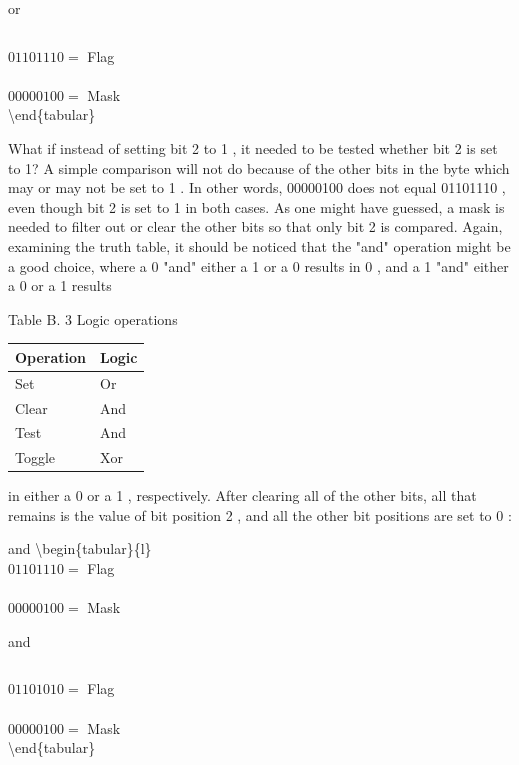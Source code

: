 \documentclass[10pt]{book}
\begin{document}
\begin{center}
\begin{center}
\begin{center}
\begin{center}
\begin{center}
 or $\quad$\begin{tabular}{l}
\end{tabular}

$01101110=$ Flag \\
\\
$00000100=$ Mask\\
\textbackslash end\{tabular\}

What if instead of setting bit 2 to 1 , it needed to be tested whether bit 2 is set to 1? A simple comparison will not do because of the other bits in the byte which may or may not be set to 1 . In other words, 00000100 does not equal 01101110 , even though bit 2 is set to 1 in both cases. As one might have guessed, a mask is needed to filter out or clear the other bits so that only bit 2 is compared. Again, examining the truth table, it should be noticed that the "and" operation might be a good choice, where a 0 "and" either a 1 or a 0 results in 0 , and a 1 "and" either a 0 or a 1 results

Table B. 3 Logic operations

\begin{center}
\begin{tabular}{|l|l|}
\hline
Operation & Logic \\
\hline
Set & Or \\
\hline
Clear & And \\
\hline
Test & And \\
\hline
Toggle & Xor \\
\hline
\end{tabular}
\end{center}

in either a 0 or a 1 , respectively. After clearing all of the other bits, all that remains is the value of bit position 2 , and all the other bit positions are set to 0 :

and \textbackslash begin\{tabular\}\{l\}\\
$01101110=$ Flag \\
\\
$00000100=$ Mask

 and \begin{tabular}{l}
\end{tabular}

$01101010=$ Flag \\
\\
$00000100=$ Mask\\
\textbackslash end\{tabular\}


\end{center}
\end{center}
\end{center}
\end{center}
\end{center}
\end{document}
